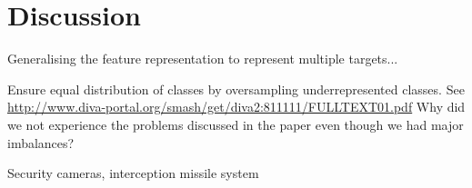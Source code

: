 
\section{Discussion}
\label{sec:discussion}
Generalising the feature representation to represent multiple targets...

Ensure equal distribution of classes by oversampling underrepresented classes. See \url{http://www.diva-portal.org/smash/get/diva2:811111/FULLTEXT01.pdf} Why did we not experience the problems discussed in the paper even though we had major imbalances?

Security cameras, interception missile system